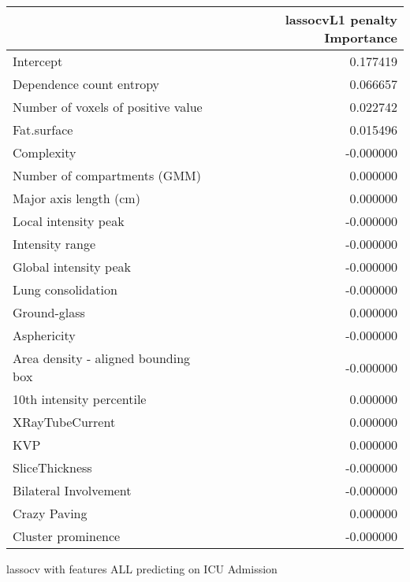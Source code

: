 {\begin{tabular}{lr}
\toprule
{} &  lassocvL1 penalty Importance \\
\midrule
Intercept                           &                      0.177419 \\
Dependence count entropy            &                      0.066657 \\
Number of voxels of positive value  &                      0.022742 \\
Fat.surface                         &                      0.015496 \\
Complexity                          &                     -0.000000 \\
Number of compartments (GMM)        &                      0.000000 \\
Major axis length (cm)              &                      0.000000 \\
Local intensity peak                &                     -0.000000 \\
Intensity range                     &                     -0.000000 \\
Global intensity peak               &                     -0.000000 \\
Lung consolidation                  &                     -0.000000 \\
Ground-glass                        &                      0.000000 \\
Asphericity                         &                     -0.000000 \\
Area density - aligned bounding box &                     -0.000000 \\
10th intensity percentile           &                      0.000000 \\
XRayTubeCurrent                     &                      0.000000 \\
KVP                                 &                      0.000000 \\
SliceThickness                      &                     -0.000000 \\
Bilateral Involvement               &                     -0.000000 \\
Crazy Paving                        &                      0.000000 \\
Cluster prominence                  &                     -0.000000 \\
\bottomrule
\end{tabular}

lassocv with features ALL predicting on ICU Admission

}
